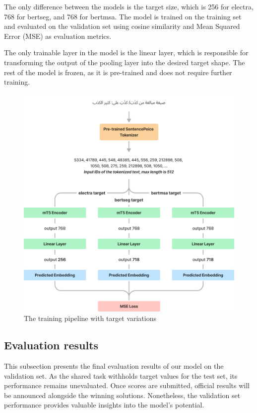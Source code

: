 \documentclass[15pt]{article}
\begin{document}
The only difference between the models is the target size, which is 256 for electra, 768 for bertseg, and 768 for bertmsa. The model is trained on the training set and evaluated on the validation set using cosine similarity and Mean Squared Error (MSE) as evaluation metrics.

The only trainable layer in the model is the linear layer, which is responsible for transforming the output of the pooling layer into the desired target shape. The rest of the model is frozen, as it is pre-trained and does not require further training.

\begin{figure}[H]
    \centering
    \captionsetup{justification=centering}
    \includegraphics[width=\textwidth]{training.png}
    \caption{The training pipeline with target variations}
    \label{fig:training}
\end{figure}

\subsection{Evaluation results}

This subsection presents the final evaluation results of our model on the validation set. As the shared task withholds target values for the test set, its performance remains unevaluated. Once scores are submitted, official results will be announced alongside the winning solutions. Nonetheless, the validation set performance provides valuable insights into the model's potential.
\end{document}
